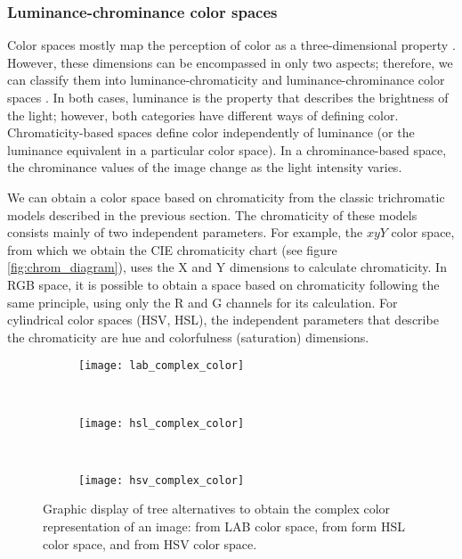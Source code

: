 \subsubsection{Luminance-chrominance color spaces}%

Color spaces mostly map the perception of color as a three-dimensional property \citep{Douglas.Kerr:Online:2005}. However, these dimensions can be encompassed in only two aspects; therefore, we can classify them into luminance-chromaticity and luminance-chrominance color spaces \citep{Kerr:Online:2003}. In both cases, luminance is the property that describes the brightness of the light; however, both categories have different ways of defining color. Chromaticity-based spaces define color independently of luminance (or the luminance equivalent in a particular color space). In a chrominance-based space, the chrominance values of the image change as the light intensity varies.
  
We can obtain a color space based on chromaticity from the classic trichromatic models described in the previous section. The chromaticity of these models consists mainly of two independent parameters. For example, the $xyY$ color space, from which we obtain the CIE chromaticity chart (see figure \ref{fig:chrom_diagram}), uses the X and Y dimensions to calculate chromaticity. In RGB space, it is possible to obtain a space based on chromaticity following the same principle, using only the R and G channels for its calculation. For cylindrical color spaces (HSV, HSL), the independent parameters that describe the chromaticity are hue and colorfulness (saturation) dimensions.

\begin{figure}[!ht] 
	\centering
	\begin{subfigure}[b]{0.48\textwidth}
		\centering
		\texttt{[image: lab\_complex\_color]}
		\caption{}	
		\label{fig:lab_complex_color}
	\end{subfigure}
	~%
	\begin{subfigure}[b]{0.48\textwidth}
		\centering
		\texttt{[image: hsl\_complex\_color]}
		\caption{}	
		\label{fig:hsl_complex_color}
	\end{subfigure}
	~%
	\begin{subfigure}[b]{0.48\textwidth}
		\centering
		\texttt{[image: hsv\_complex\_color]}
		\caption{ }	
		\label{fig:hsv_complex_color}
	\end{subfigure}
	
	\caption{Graphic display of tree alternatives to obtain the complex color representation of an image:  from LAB color space,  from form HSL color space, and  from HSV color space.}
	\label{fig:complex_color_spaces}
\end{figure}

